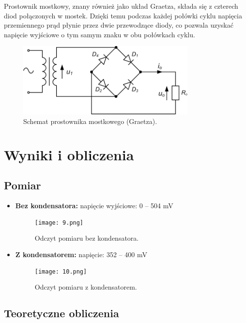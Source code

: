 \documentclass[a4paper,12pt]{article}
\begin{document}
Prostownik mostkowy, znany również jako układ Graetza, składa się z czterech diod połączonych w mostek. Dzięki temu podczas każdej połówki cyklu napięcia przemiennego prąd płynie przez dwie przewodzące diody, co pozwala uzyskać napięcie wyjściowe o tym samym znaku w obu połówkach cyklu.

\begin{figure}[H]
    \centering
    \includegraphics[width=0.8\textwidth]{8.png}
    \caption{Schemat prostownika mostkowego (Graetza).}
    \label{fig:schemat_mostek}
\end{figure}

\section*{Wyniki i obliczenia}

\subsection*{Pomiar}

\begin{itemize}
    \item \textbf{Bez kondensatora:} napięcie wyjściowe: 0 -- 504 mV
    \begin{figure}[H]
        \centering
        \texttt{[image: 9.png]}
        \caption{Odczyt pomiaru bez kondensatora.}
        \label{fig:bez_kondensatora_mostek}
    \end{figure}

    \item \textbf{Z kondensatorem:} napięcie: 352 -- 400 mV
    \begin{figure}[H]
        \centering
        \texttt{[image: 10.png]}
        \caption{Odczyt pomiaru z kondensatorem.}
        \label{fig:z_kondensatorem_mostek}
    \end{figure}
\end{itemize}

\subsection*{Teoretyczne obliczenia}
\end{document}
